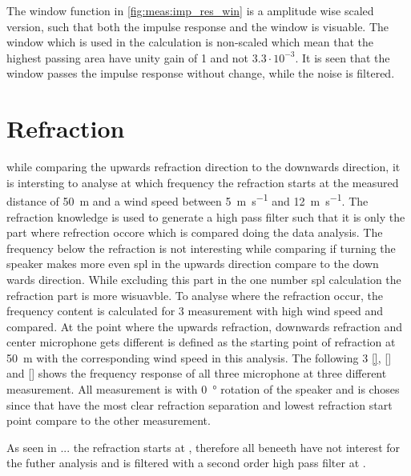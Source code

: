 

The window function in \autoref{fig:meas:imp_res_win} is a amplitude wise scaled version, such that both the impulse response and the window is visuable. The window which is used in the calculation is non-scaled which mean that the highest passing area have unity gain of 1 and not $3.3 \cdot 10^{-3}$. It is seen that the window passes the impulse response without change, while the noise is filtered.



\section{Refraction}
while comparing the upwards refraction direction to the downwards direction, it is intersting to analyse at which frequency the refraction starts at the measured distance of \SI{50}{\meter} and a wind speed between \SI{5}{\meter\per\second} and \SI{12}{\meter\per\second}. The refraction knowledge is used to generate a high pass filter such that it is only the part where refrection occore which is compared doing the data analysis. The frequency below the refraction is not interesting while comparing if turning the speaker makes more even \gls{spl} in the upwards direction compare to the down wards direction. While excluding this part in the one number \gls{spl} calculation the refraction part is more wisuavble. To analyse where the refraction occur, the frequency content is calculated for 3 measurement with high wind speed and compared. At the point where the upwards refraction, downwards refraction and center microphone gets different is defined as the starting point of refraction at \SI{50}{\meter} with the corresponding wind speed in this analysis. The following 3 \autoref{}, \autoref{} and \autoref{} shows the frequency response of all three microphone at three different measurement. All measurement is with \SI{0}{\degree} rotation of the speaker and is choses since that have the most clear refraction separation and lowest refraction start point compare to the other measurement.




As seen in ... the refraction starts at , therefore all beneeth  have not interest for the futher analysis and is filtered with a second order high pass filter at . 





